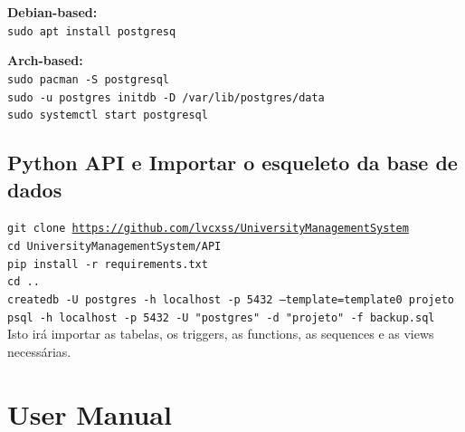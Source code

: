 \documentclass[a4paper, 11pt]{article}
\begin{document}
\noindent\textbf{Debian-based:}\\
\texttt{sudo apt install postgresq}

\noindent\textbf{Arch-based:}\\
\texttt{sudo pacman -S postgresql\\
sudo -u postgres initdb -D /var/lib/postgres/data\\
sudo systemctl start postgresql}

\subsection{Python API e Importar o esqueleto da base de dados}
\texttt{git clone \href{https://github.com/lvcxss/UniversityManagementSystem}{https://github.com/lvcxss/UniversityManagementSystem}\\cd UniversityManagementSystem/API\\pip install -r requirements.txt}\\

\noindent
\texttt{cd ..\\
createdb -U postgres -h localhost -p 5432 --template=template0 projeto\\
psql -h localhost -p 5432 -U "postgres" -d "projeto" -f backup.sql}\\

\noindent
Isto irá importar as tabelas, os triggers, as functions, as sequences e as views necessárias.

\newpage
\section{User Manual}

\newcommand\PUT{{\bfseries\color{Blue} PUT}}
\newcommand\POST{{\bfseries\color{BurntOrange} POST}}
\newcommand\GET{{\bfseries\color{Green} GET}}
\newcommand\DELETE{{\bfseries\color{Maroon} DELETE}}

\newcommand\requestpar[4]{
  \vspace{0.5em}
  \noindent
  {#1} \href{http://localhost:8080#2}{#2}\\{#3}
  \vspace{0.5em}
  \ifx\relax#4\relax\else
    \par\hfill\begin{minipage}{0.95\textwidth}
    {\texttt{#4}}
    \end{minipage} 
  \fi
  \par
  \vspace{1em}
}
\end{document}
